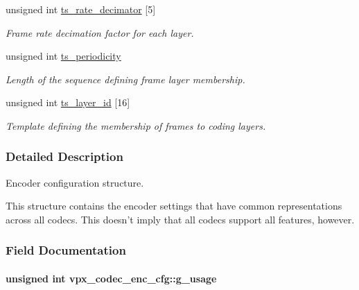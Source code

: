 \begin{DoxyCompactItemize}
unsigned int \hyperlink{structvpx__codec__enc__cfg_ad40c30846ef8ef1d8684f10a491ec535}{ts\-\_\-rate\-\_\-decimator} \mbox{[}5\mbox{]}
\begin{DoxyCompactList}\small\item\em \-Frame rate decimation factor for each layer. \end{DoxyCompactList}\item 
unsigned int \hyperlink{structvpx__codec__enc__cfg_a4ec338780115dd270acf0dac24193474}{ts\-\_\-periodicity}
\begin{DoxyCompactList}\small\item\em \-Length of the sequence defining frame layer membership. \end{DoxyCompactList}\item 
unsigned int \hyperlink{structvpx__codec__enc__cfg_a4d105d2470dbfb7210b33d298f1cf1f6}{ts\-\_\-layer\-\_\-id} \mbox{[}16\mbox{]}
\begin{DoxyCompactList}\small\item\em \-Template defining the membership of frames to coding layers. \end{DoxyCompactList}\end{DoxyCompactItemize}


\subsubsection{\-Detailed \-Description}
\-Encoder configuration structure. 

\-This structure contains the encoder settings that have common representations across all codecs. \-This doesn't imply that all codecs support all features, however. 

\subsubsection{\-Field \-Documentation}
\hypertarget{structvpx__codec__enc__cfg_a5bcf7fc1efc4890de351e3c6fe252355}{
\paragraph[{g\-\_\-usage}]{\setlength{\rightskip}{0pt plus 5cm}unsigned int {\bf vpx\-\_\-codec\-\_\-enc\-\_\-cfg\-::g\-\_\-usage}}}\label{structvpx__codec__enc__cfg_a5bcf7fc1efc4890de351e3c6fe252355}


